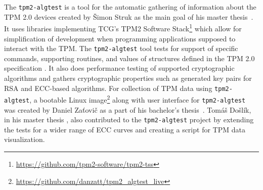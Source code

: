  The \texttt{tpm2-algtest} is a tool for the automatic gathering of information about the TPM 2.0 devices created by Šimon Struk as the main goal of his master thesis~\cite{Struk2019thesis}. It uses libraries implementing TCG's TPM2 Software Stack\footnote{\url{https://github.com/tpm2-software/tpm2-tss}} which allow for simplification of development when programming applications supposed to interact with the TPM. The \texttt{tpm2-algtest} tool tests for support of specific commands, supporting routines, and values of structures defined in the TPM 2.0 specification \cite{tcg_p3_commands, tcg_p4_supproutines, tcg_p2_structures}. It also does performance testing of supported cryptographic algorithms and gathers cryptographic properties such as generated key pairs for RSA and ECC-based algorithms. For collection of TPM data using \texttt{tpm2-algtest}, a bootable Linux image\footnote{\url{https://github.com/danzatt/tpm2_algtest_live}} along with user interface for \texttt{tpm2-algtest} was created by Daniel Zaťovič as a part of his bachelor's thesis~\cite{Zatovic2020thesis}. Tomáš Došlík, in his master thesis \cite{Doslik2021thesis}, also contributed to the \texttt{tpm2-algtest} project by extending the tests for a wider range of ECC curves and creating a script for TPM data visualization. 